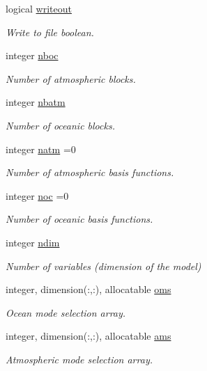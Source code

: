 \begin{DoxyCompactItemize}
logical \hyperlink{namespaceparams_affc7b423a975c0e92b62e67ed04edea5}{writeout}
\begin{DoxyCompactList}\small\item\em Write to file boolean. \end{DoxyCompactList}\item 
integer \hyperlink{namespaceparams_a54123b5a947703d21d0c882dec6780ac}{nboc}
\begin{DoxyCompactList}\small\item\em Number of atmospheric blocks. \end{DoxyCompactList}\item 
integer \hyperlink{namespaceparams_aa5dc201b0a59d8bb25a5dc52d2ed3cac}{nbatm}
\begin{DoxyCompactList}\small\item\em Number of oceanic blocks. \end{DoxyCompactList}\item 
integer \hyperlink{namespaceparams_a4f46551b6a8ad183d2dced1da3dc5fed}{natm} =0
\begin{DoxyCompactList}\small\item\em Number of atmospheric basis functions. \end{DoxyCompactList}\item 
integer \hyperlink{namespaceparams_acdb6ef89bcada9ba7b6b6bba575b60f4}{noc} =0
\begin{DoxyCompactList}\small\item\em Number of oceanic basis functions. \end{DoxyCompactList}\item 
integer \hyperlink{namespaceparams_a2323fe1773f086e20c14f266351c482b}{ndim}
\begin{DoxyCompactList}\small\item\em Number of variables (dimension of the model) \end{DoxyCompactList}\item 
integer, dimension(\+:,\+:), allocatable \hyperlink{namespaceparams_a5e25e072992d5908eea5308243b7ec63}{oms}
\begin{DoxyCompactList}\small\item\em Ocean mode selection array. \end{DoxyCompactList}\item 
integer, dimension(\+:,\+:), allocatable \hyperlink{namespaceparams_aa95299f1a9c54693b85e049004369089}{ams}
\begin{DoxyCompactList}\small\item\em Atmospheric mode selection array. \end{DoxyCompactList}\end{DoxyCompactItemize}


